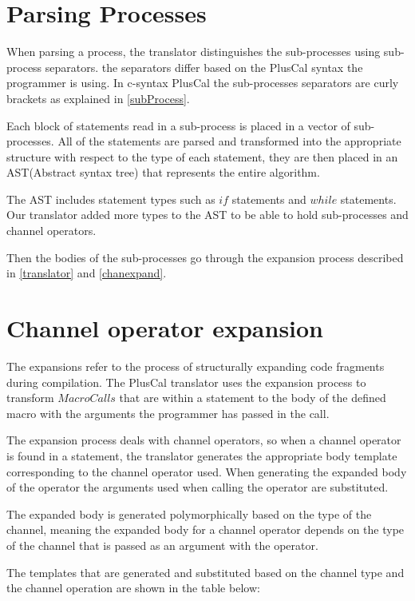 \documentclass{thesul}
\begin{document}
\section{Parsing Processes}

When parsing a process, the translator distinguishes the sub-processes using sub-process separators. the separators differ based on the PlusCal syntax the programmer is using. In c-syntax PlusCal the sub-processes separators are curly brackets as explained in \ref{subProcess}.

Each block of statements read in a sub-process is placed in a vector of sub-processes. All of the statements are parsed and transformed into the appropriate structure with respect to the type of each statement, they are then placed in an AST(Abstract syntax tree) that represents the entire algorithm.

The AST includes statement types such as $if$ statements and $while$ statements. Our translator added more types to the AST to be able to hold sub-processes and channel operators.


Then the bodies of the sub-processes go through the expansion process described in \ref{translator} and \ref{chanexpand}.

\label{parsesub}
\section{Channel operator expansion}

The expansions refer to the process of structurally expanding code fragments during compilation. The PlusCal translator uses the expansion process to transform $Macro Calls$ that are within a statement to the body of the defined macro with the arguments the programmer has passed in the call.

The expansion process deals with channel operators, so when a channel operator is found in a statement, the translator generates the appropriate body template corresponding to the channel operator used. When generating the expanded body of the operator the arguments used when calling the operator are substituted.

The expanded body is generated polymorphically based on the type of the channel, meaning the expanded body for a channel operator  depends on the type of the channel that is passed as an argument with the operator.

The templates that are generated and substituted based on the channel type and the channel operation are shown in the table below:
\end{document}
